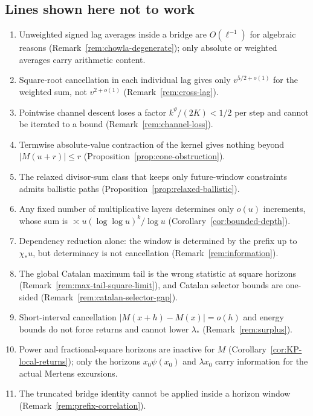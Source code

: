 \documentclass[11pt]{amsart}
\numberwithin{equation}{section}
\theoremstyle{plain}
\theoremstyle{definition}
\theoremstyle{remark}
\begin{document}
\subsection*{Lines shown here not to work}
\begin{enumerate}[label=\textup{(\arabic*)}]
\item Unweighted signed lag averages inside a bridge are $O(\ell^{-1})$ for
algebraic reasons (Remark~\ref{rem:chowla-degenerate}); only absolute or
weighted averages carry arithmetic content.
\item Square-root cancellation in each individual lag gives only
$v^{5/2+o(1)}$ for the weighted sum, not $v^{2+o(1)}$
(Remark~\ref{rem:cross-lag}).
\item Pointwise channel descent loses a factor $k^\vartheta/(2K)<1/2$ per
step and cannot be iterated to a bound (Remark~\ref{rem:channel-loss}).
\item Termwise absolute-value contraction of the kernel gives nothing beyond
$|M(u+r)|\le r$ (Proposition~\ref{prop:cone-obstruction}).
\item The relaxed divisor-sum class that keeps only future-window
constraints admits ballistic paths (Proposition~\ref{prop:relaxed-ballistic}).
\item Any fixed number of multiplicative layers determines only $o(u)$
increments, whose sum is $\asymp u(\log\log u)^k/\log u$
(Corollary~\ref{cor:bounded-depth}).
\item Dependency reduction alone: the window is determined by the prefix up
to $\chi_*u$, but determinacy is not cancellation
(Remark~\ref{rem:information}).
\item The global Catalan maximum tail is the wrong statistic at square
horizons (Remark~\ref{rem:max-tail-square-limit}), and Catalan selector
bounds are one-sided (Remark~\ref{rem:catalan-selector-gap}).
\item Short-interval cancellation $|M(x+h)-M(x)|=o(h)$ and energy bounds do
not force returns and cannot lower $\lambda_*$ (Remark~\ref{rem:surplus}).
\item Power and fractional-square horizons are inactive for $M$
(Corollary~\ref{cor:KP-local-returns}); only the horizons $x_0\psi(x_0)$
and $\lambda x_0$ carry information for the actual Mertens excursions.
\item The truncated bridge identity cannot be applied inside a horizon
window (Remark~\ref{rem:prefix-correlation}).
\end{enumerate}
\end{document}
